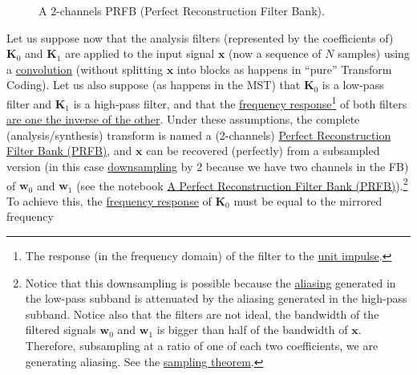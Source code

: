 \begin{figure}
  \centering
  \caption{A 2-channels PRFB (Perfect Reconstruction Filter Bank).}
  \label{fig:PRFB}
\end{figure}

Let us suppose now that the analysis filters (represented by the
coefficients of) ${\mathbf K}_0$ and ${\mathbf K}_1$ are applied to
the input signal ${\mathbf x}$ (now a sequence of $N$ samples) using a
\href{https://en.wikipedia.org/wiki/Kernel_(image_processing)}{convolution}
(without splitting $\mathbf{x}$ into blocks as happens in ``pure''
Transform Coding). Let us also suppose (as happens in the MST) that
${\mathbf K}_0$ is a low-pass filter and ${\mathbf K}_1$ is a
high-pass filter, and that the
\href{https://en.wikipedia.org/wiki/Filter_(signal_processing)}{frequency
  response}\footnote{The response (in the frequency domain) of the
filter to the
\href{https://en.wikipedia.org/?title=Unit_impulse&redirect=no}{unit
  impulse}.} of both filters
\href{https://en.wikipedia.org/wiki/Filter_bank#Perfect_reconstruction_filter_banks}{are
  one the inverse of the other}. Under these assumptions, the complete
(analysis/synthesis) transform is named a (2-channels)
\href{https://en.wikipedia.org/wiki/Filter_bank#Perfect_reconstruction_filter_banks}{Perfect
  Reconstruction Filter Bank (PRFB)}, and ${\mathbf x}$ can be
recovered (perfectly) from a subsampled version (in this case
\href{https://en.wikipedia.org/wiki/Downsampling_(signal_processing)}{downsampling}
by 2 because we have two channels in the FB) of ${\mathbf w}_0$ and
${\mathbf w}_1$ (see the notebook
\href{https://github.com/Tecnologias-multimedia/Tecnologias-multimedia.github.io/blob/master/contents/transform_coding/PRFB.ipynb}{A
  Perfect Reconstruction Filter Bank (PRFB)}).\footnote{Notice that
this downsampling is possible because the
\href{https://en.wikipedia.org/wiki/Aliasing}{aliasing} generated in
the low-pass subband is attenuated by the aliasing generated in the
high-pass subband. Notice also that the filters are not ideal, the
bandwidth of the filtered signals ${\mathbf w}_0$ and ${\mathbf w}_1$
is bigger than half of the bandwidth of ${\mathbf x}$. Therefore,
subsampling at a ratio of one of each two coefficients, we are
generating aliasing. See the
\href{https://en.wikipedia.org/wiki/Nyquist-Shannon_sampling_theorem}{sampling
  theorem}.} To achieve this, the
\href{https://en.wikipedia.org/wiki/Filter_(signal_processing)}{frequency
  response} of ${\mathbf K}_0$ must be equal to the mirrored frequency
